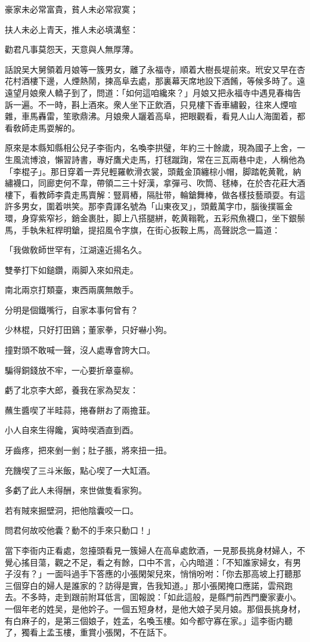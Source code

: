 豪家未必常富貴，貧人未必常寂寞；

扶人未必上青天，推人未必填溝壑：

勸君凡事莫怨天，天意與人無厚薄。

話說吴大舅領着月娘等一簇男女，離了永福寺，順着大樹長堤前來。玳安又早在杏花村酒樓下邊，人煙熱鬧，揀高阜去處，那裏幕天席地設下酒餚，等候多時了。遠遠望月娘衆人轎子到了，問道：「如何這咱纔來？」月娘又把永福寺中遇見春梅告訴一遍。不一時，斟上酒來。衆人坐下正飲酒，只見樓下香車繡轂，往來人煙喧雜，車馬轟雷，笙歌鼎沸。月娘衆人躧着高阜，把眼觀看，看見人山人海圍着，都看敎師走馬耍解的。

原來是本縣知縣相公兒子李衙内，名喚李拱璧，年約三十餘歲，現為國子上舍，一生風流博浪，懶習詩書，專好鷹犬走馬，打毬蹴踘，常在三瓦兩巷中走，人稱他為「李棍子」。那日穿着一弄兒輕羅軟滑衣裳，頭戴金頂纏棕小帽，脚踏乾黄靴，納繡襪口，同廊吏何不韋，帶領二三十好漢，拿彈弓、吹筒、毬棒，在於杏花莊大酒樓下，看教師李貴走馬賣解：豎肩樁，隔肚带，輪鎗舞棒，做各樣技藝頑耍。有這許多男女，圍着哄笑。那李貴諢名號為「山東夜叉」，頭戴萬字巾，腦後撲匾金環，身穿紫窄衫，銷金裹肚，脚上八搭腿絣，乾黄䩺靴，五彩飛魚襪口，坐下銀鬃馬，手執朱紅桿明鎗，提招風令字旗，在街心扳鞍上馬，高聲説念一篇道：

「我做敎師世罕有，江湖遠近揚名久。

雙拳打下如鎚鑽，兩脚入來如飛走。

南北兩京打類臺，東西兩廣無敵手。

分明是個鐵嘴行，自家本事何曾有？

少林棍，只好打田鷄；董家拳，只好嚇小狗。

撞對頭不敢喊一聲，沒人處專會誇大口。

騙得銅錢放不牢，一心要折章臺柳。

虧了北京李大郎，養我在家為契友：

蘸生醬喫了半畦蒜，捲春餅お了兩擔韮。

小人自來生得饞，寅時喫酒直到酉。

牙齒疼，把來剉一剉；肚子脹，將來扭一扭。

充饑喫了三斗米飯，點心喫了一大缸酒。

多虧了此人未得酬，來世做隻看家狗。

若有賊來掘壁洞，把他陰囊咬一口。

問君何故咬他囊？動不的手來只動口！」

當下李衙内正看處，忽擡頭看見一簇婦人在高阜處飲酒，一見那長挑身材婦人，不覺心搖目蕩，觀之不足，看之有餘，口中不言，心内暗道：「不知誰家婦女，有男子沒有？」一面呌過手下答應的小張閑架兒來，悄悄吩咐：「你去那高坡上打聽那三個穿白的婦人是誰家的？訪得是實，告我知道。」那小張閑掩口應諾，雲飛跑去。不多時，走到跟前附耳低言，囬報說：「如此這般，是縣門前西門慶家妻小。一個年老的姓吴，是他妗子。一個五短身材，是他大娘子吴月娘。那個長挑身材，有白麻子的，是第三個娘子，姓孟，名喚玉樓。如今都守寡在家。」這李衙内聽了，獨看上孟玉樓，重賞小張閑，不在話下。

